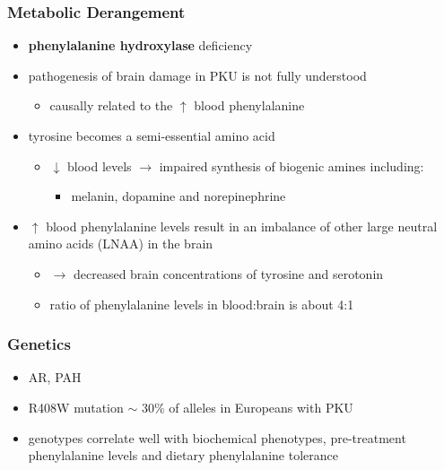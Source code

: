 \documentclass{scrartcl}
\begin{document}
\subsubsection{Metabolic Derangement}
\label{sec:orge1ee836}
\begin{itemize}
\item \textbf{phenylalanine hydroxylase} deficiency
\item pathogenesis of brain damage in PKU is not fully understood
\begin{itemize}
\item causally related to the \(\uparrow\) blood phenylalanine
\end{itemize}
\item tyrosine becomes a semi-essential amino acid
\begin{itemize}
\item \(\downarrow\) blood levels \(\to\) impaired synthesis of biogenic amines including:
\begin{itemize}
\item melanin, dopamine and norepinephrine
\end{itemize}
\end{itemize}
\item \(\uparrow\) blood phenylalanine levels result in an imbalance of other large
neutral amino acids (LNAA) in the brain
\begin{itemize}
\item \(\to\) decreased brain concentrations of tyrosine and serotonin
\item ratio of phenylalanine levels in blood:brain is about 4:1
\end{itemize}
\end{itemize}

\subsubsection{Genetics}
\label{sec:org50a4ff7}
\begin{itemize}
\item AR, PAH
\item R408W mutation \(\sim\) 30\% of alleles in Europeans with PKU
\item genotypes correlate well with biochemical phenotypes, pre-treatment
phenylalanine levels and dietary phenylalanine tolerance
\end{itemize}
\end{document}
